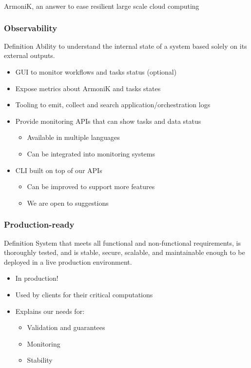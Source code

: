 \documentclass[10pt,aspectratio=1609]{beamer}
\begin{document}
\begin{section}{ArmoniK, an answer to ease resilient large scale cloud computing}
  \begin{frame}
    \frametitle{Observability}
    \begin{block}{Definition}
      Ability to understand the internal state of a system based solely on its external outputs.
    \end{block}
    \begin{itemize}
      \item GUI to monitor workflows and tasks status (optional)
      \item Expose metrics about ArmoniK and tasks states
      \item Tooling to emit, collect and search application/orchestration logs
      \item Provide monitoring APIs that can show tasks and data status
      \begin{itemize}
        \item Available in multiple languages
        \item Can be integrated into monitoring systems
      \end{itemize}
      \item CLI built on top of our APIs
      \begin{itemize}
        \item Can be improved to support more features
        \item We are open to suggestions
      \end{itemize}
    \end{itemize}
  \end{frame}

  \begin{frame}
    \frametitle{Production-ready}
    \begin{block}{Definition}
      System that meets all functional and non-functional requirements, is thoroughly tested, and is stable, secure, scalable, and maintainable enough to be deployed in a live production environment.
    \end{block}
    \begin{itemize}
      \item In production!
      \item Used by clients for their critical computations
      \item Explains our needs for:
      \begin{itemize}
        \item Validation and guarantees
        \item Monitoring
        \item Stability
      \end{itemize}
    \end{itemize}
  \end{frame}

\end{section}
\end{document}
